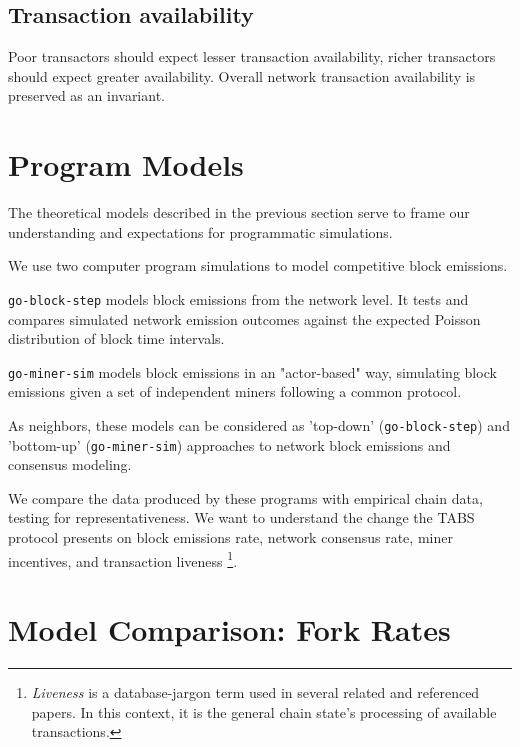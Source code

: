 \documentclass[11pt]{article}
\theoremstyle{plain}
\begin{document}
{\subsection{\normalsize{Transaction availability}}

Poor transactors should expect lesser transaction availability,
richer transactors should expect greater availability.
Overall network transaction availability is preserved as an invariant.


\section{\normalsize{Program Models}}

The theoretical models described in the previous section serve to
frame our understanding and expectations for programmatic simulations.

We use two computer program simulations to model competitive block emissions.

\texttt{go-block-step} models block emissions from the network level.
It tests and compares simulated network emission outcomes
against the expected Poisson distribution of block time intervals.

\texttt{go-miner-sim} models block emissions in an "actor-based" way,
simulating block emissions given a set of independent miners following a common protocol.

As neighbors, these models can be considered as 'top-down' (\texttt{go-block-step}) and 'bottom-up' (\texttt{go-miner-sim})
approaches to network block emissions and consensus modeling.

We compare the data produced by these programs with empirical chain data, testing for representativeness.
We want to understand the change the TABS protocol presents on block emissions rate,
network consensus rate, miner incentives, and transaction liveness\nolinebreak
\footnote{\emph{Liveness} is a database-jargon term used in several related and referenced papers.
In this context, it is the general chain state's processing of available transactions.
}.


\section{\normalsize{Model Comparison: Fork Rates}}

}
\end{document}
